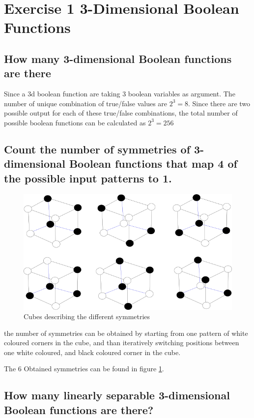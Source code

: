 \section{Exercise 1 3-Dimensional Boolean Functions}

\subsection{How many 3-dimensional Boolean functions are there}

Since a 3d boolean function are taking 3 boolean variables as argument. The number of unique combination of true/false values are $2^3 = 8$. Since there are two possible output for each of these true/false combinations, the total number of possible boolean functions can be calculated as $2^3 = 256$

\subsection{Count the number of symmetries of 3-dimensional Boolean functions that map 4 of the possible input patterns to 1.}

\begin{figure}
    \centering
    \includegraphics[scale=0.7]{FigSymmetry}
    \caption{Cubes describing the different symmetries}
    \label{fig:4tsym}
\end{figure}

the number of symmetries can be obtained by starting from one pattern of white coloured corners in the cube, and than iteratively switching positions between one white coloured, and black coloured corner in the cube.

The 6 Obtained symmetries can be found in figure \ref{fig:4tsym}.

\subsection{How many linearly separable 3-dimensional Boolean functions are there?}

